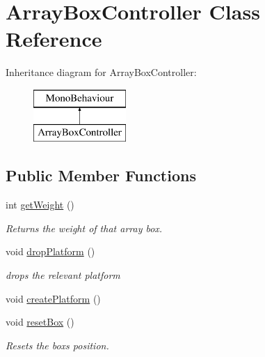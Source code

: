 \hypertarget{class_array_box_controller}{}\section{Array\+Box\+Controller Class Reference}
\label{class_array_box_controller}
Inheritance diagram for Array\+Box\+Controller\+:\begin{figure}[H]
\begin{center}
\leavevmode
\includegraphics[height=2.000000cm]{class_array_box_controller}
\end{center}
\end{figure}
\subsection*{Public Member Functions}
\begin{DoxyCompactItemize}
\item 
int \hyperlink{class_array_box_controller_aca5b840fdc879a3268c9a57a439d6172}{get\+Weight} ()
\begin{DoxyCompactList}\small\item\em Returns the weight of that array box. \end{DoxyCompactList}\item 
void \hyperlink{class_array_box_controller_a926861290e0d8414a771456f9d573659}{drop\+Platform} ()
\begin{DoxyCompactList}\small\item\em drops the relevant platform \end{DoxyCompactList}\item 
void \hyperlink{class_array_box_controller_aaee7f59464d3cddf435e9669faacd8aa}{create\+Platform} ()
\item 
void \hyperlink{class_array_box_controller_a457e96d6ccf856144d580f392dcc17e8}{reset\+Box} ()
\begin{DoxyCompactList}\small\item\em Resets the boxs position. \end{DoxyCompactList}\end{DoxyCompactItemize}
